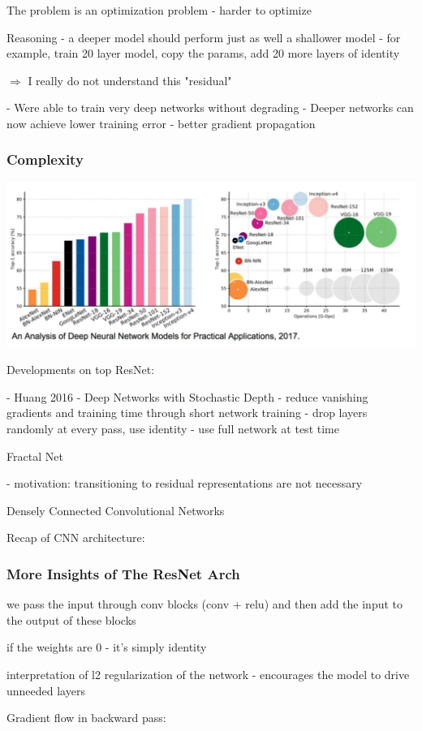 The problem is an optimization problem - harder to optimize

Reasoning - a deeper model should perform just as well a shallower model - for example, train 20 layer model, copy the params, add 20 more layers of identity

$\Rightarrow$ I really do not understand this "residual"

- Were able to train very deep networks without degrading
- Deeper networks can now achieve lower training error - better gradient propagation

\subsubsection{Complexity}

\includegraphics[width=0.5\columnwidth]{fei_fei_li/lecture_09/complexity.png}



Developments on top ResNet: 

- Huang 2016 - Deep Networks with Stochastic Depth
  - reduce vanishing gradients and training time through short network training
  - drop layers randomly at every pass, use identity
  - use full network at test time

Fractal Net

- motivation: transitioning to residual representations are not necessary

Densely Connected Convolutional Networks

Recap of CNN architecture: 

\subsubsection{More Insights of The ResNet Arch}

we pass the input through conv blocks (conv + relu)  and then add the input to the output of these blocks

if the weights are 0 - it's simply identity

interpretation of l2 regularization of the network - encourages the model to drive unneeded layers

Gradient flow in backward pass:

